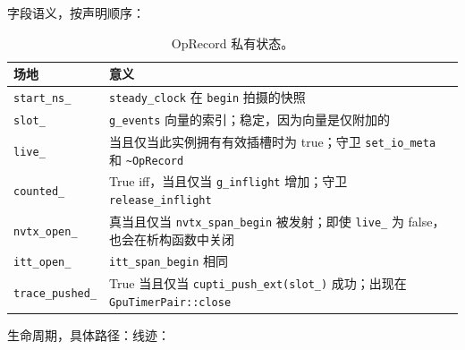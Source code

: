 字段语义，按声明顺序：

\begin{table}[H]
\centering
\caption{OpRecord 私有状态。}
\label{tab:oprecordstate}
\small
\begin{tabular}{lp{9.2cm}}
\toprule
场地 & 意义 \\
\midrule
\texttt{start\_ns\_} & \texttt{steady\_clock} 在 \texttt{begin} 拍摄的快照 \\
\texttt{slot\_} & \texttt{g\_events} 向量的索引；稳定，因为向量是仅附加的 \\
\texttt{live\_} & 当且仅当此实例拥有有效插槽时为 true；守卫 \texttt{set\_io\_meta} 和 \texttt{\textasciitilde OpRecord} \\
\texttt{counted\_} & True iff，当且仅当 \texttt{g\_inflight} 增加；守卫 \texttt{release\_inflight} \\
\texttt{nvtx\_open\_} & 真当且仅当 \texttt{nvtx\_span\_begin} 被发射；即使 \texttt{live\_} 为 false，也会在析构函数中关闭 \\
\texttt{itt\_open\_} & \texttt{itt\_span\_begin} 相同 \\
\texttt{trace\_pushed\_} & True 当且仅当 \texttt{cupti\_push\_ext(slot\_)} 成功；出现在 \texttt{GpuTimerPair::close} \\
\bottomrule
\end{tabular}
\end{table}

生命周期，具体路径：线迹：

